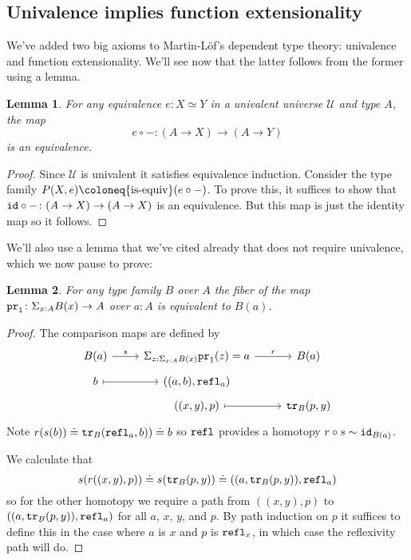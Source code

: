 \documentclass{amsart}
\theoremstyle{theorem}
\newtheorem*{lem}{Lemma}
\theoremstyle{definition}
\theoremstyle{remark}
\newcommand{\0}{\mathbbe{0}}
\newcommand{\1}{\mathbbe{1}}
\newcommand{\2}{\mathbbe{2}}
\newcommand{\3}{\mathbbe{3}}
\newcommand{\4}{\mathbbe{4}}
\newcommand{\term}[1]{{\textup{\texttt{#1}}}}
\newcommand{\type}[1]{{\textup{#1}}}
\newcommand{\id}{\term{id}}
\newcommand{\pr}{\term{pr}}
\newcommand{\refl}{\term{refl}}
\newcommand{\tr}{\term{tr}}
\newcommand{\UU}{{\mathcal{U}}}
\newcommand{\isequiv}{\type{is-equiv}}
\begin{document}
\subsection*{Univalence implies function extensionality}

We've added two big axioms to Martin-L\"{o}f's dependent type theory: univalence and function extensionality. We'll see now that the latter follows from the former using a lemma.

\begin{lem} For any equivalence $e : X \simeq Y$ in a univalent universe $\UU$ and type $A$, the map
\[ e \circ - : (A \to X) \to (A \to Y)\]
is an equivalence.
\end{lem}
\begin{proof}
Since $\UU$ is univalent it satisfies equivalence induction. Consider the type family $P(X,e) \coloneq \isequiv(e \circ -)$. To prove this, it suffices to show that $\id\circ - \colon (A \to X) \to (A \to X)$ is an equivalence. But this map is just the identity map so it follows.
\end{proof}

We'll also use a lemma that we've cited already that does not require univalence, which we now pause to prove:

\begin{lem} For any type family $B$ over $A$ the fiber of the map $\pr_1 \colon \Sigma_{x:A} B(x) \to A$ over $a :A$ is equivalent to $B(a)$.
\end{lem}
\begin{proof}
The comparison maps are defined by
\[
\begin{tikzcd}[row sep=tiny] B(a) \arrow[r, "s"] & \Sigma_{z: \Sigma_{x:A}B(x)} \pr_1(z)=a \arrow[r, "r"] & B(a) \\ b \arrow[r, maps to] & ((a,b),\refl_a) \\
& ((x,y),p) \arrow[r, maps to] & \tr_B(p,y)
\end{tikzcd}
\]
Note $r(s(b)) \doteq \tr_B(\refl_a,b)) \doteq b$ so $\refl$ provides a homotopy $r \circ s \sim \id_{B(a)}$. 

We calculate that
\[ s(r((x,y),p)) \doteq s(\tr_B(p,y)) \doteq ((a, \tr_B(p,y)), \refl_a)\] so for the other homotopy we require a path from $((x,y),p)$ to $((a, \tr_B(p,y)), \refl_a)$ for all $a$, $x$, $y$, and $p$. By path induction on $p$ it suffices to define this in the case where $a$ is $x$ and $p$ is $\refl_x$, in which case the reflexivity path will do.
\end{proof}
\end{document}
